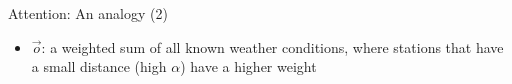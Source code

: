 \begin{vbframe}{Attention: An analogy (2)}

\vfill

\begin{itemize}
\item $\vec o$: a weighted sum of all known weather conditions, where stations that have a small distance (high $\alpha$) have a higher weight
\begin{center}
\end{center}
\end{itemize}

\vfill

\end{vbframe}


